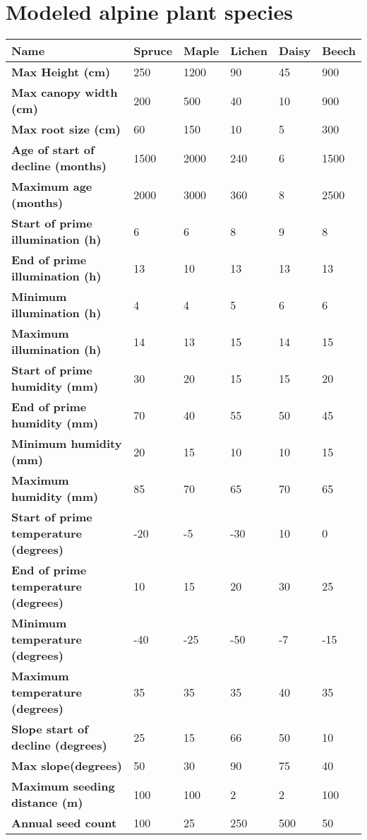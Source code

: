 \chapter{Modeled alpine plant species} \label{AppendixF}

\begin{longtable}{|p{4cm}|p{2cm}|p{2cm}|p{2cm}|p{2cm}|p{2cm}|}
		\hline		
		\textbf{Name} & \textbf{Spruce} & \textbf{Maple} & \textbf{Lichen} & \textbf{Daisy} & \textbf{Beech}\\
		\hline
		\textbf{Max Height (cm)} & 
		250 & 
		1200 & 
		90 & 
		45 & 
		900\\
		\hline
		\textbf{Max canopy width (cm)} & 
		200 & 
		500 & 
		40 & 
		10 & 
		900 \\
		\hline
		\textbf{Max root size (cm)} & 
		60 & 
		150 & 
		10 & 
		5 & 
		300 \\
		\hline
		\textbf{Age of start of decline (months)} & 
		1500 & 
		2000 & 
		240 & 
		6 & 
		1500 \\
		\hline
		\textbf{Maximum age (months)} & 
		2000 & 
		3000 & 
		360 & 
		8 & 
		2500 \\
		\hline
		\textbf{Start of prime illumination (h)} &
		6 & 
		6 & 
		8 & 
		9 & 
		8 \\
		\hline
		\textbf{End of prime illumination (h)} & 
		13 & 
		10 & 
		13 & 
		13 & 
		13 \\
		\hline
		\textbf{Minimum illumination (h)} & 
		4 & 
		4 & 
		5 & 
		6 & 
		6 \\
		\hline
		\textbf{Maximum illumination (h)} & 
		14 & 
		13 & 
		15 & 
		14 & 
		15 \\
		\hline
		\textbf{Start of prime humidity (mm)} & 
		30 & 
		20 & 
		15 & 
		15 & 
		20 \\
		\hline
		\textbf{End of prime humidity (mm)} & 
		70 & 
		40 & 
		55 & 
		50 & 
		45 \\
		\hline
		\textbf{Minimum humidity (mm)} &
		20 & 
		15 & 
		10 & 
		10 & 
		15 \\
		\hline
		\textbf{Maximum humidity (mm)} & 
		85 & 
		70 & 
		65 & 
		70 & 
		65 \\
		\hline
		\textbf{Start of prime temperature (degrees)} & 
		-20 & 
		-5 & 
		-30 & 
		10 & 
		0 \\
		\hline
		\textbf{End of prime temperature (degrees)} & 
		10 & 
		15 & 
		20 & 
		30 & 
		25 \\
		\hline
		\textbf{Minimum temperature (degrees)} & 
		-40 & 
		-25 & 
		-50 & 
		-7 & 
		-15 \\
		\hline
		\textbf{Maximum temperature (degrees)} & 
		35 & 
		35 & 
		35 & 
		40 & 
		35 \\
		\hline
		\textbf{Slope start of decline (degrees)} & 
		25 & 
		15 & 
		66 & 
		50 & 
		10 \\
		\hline
		\textbf{Max slope(degrees)} & 
		50 & 
		30 & 
		90 & 
		75 & 
		40 \\
		\hline
		\textbf{Maximum seeding distance (m)} & 
		100 & 
		100 & 
		2 & 
		2 & 
		100 \\
		\hline
		\textbf{Annual seed count} & 
		100 & 
		25 & 
		250 & 
		500 & 
		50 \\
		\hline                                                                           
\end{longtable}